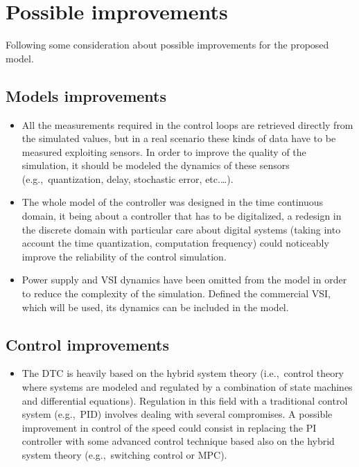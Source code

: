 \section{Possible improvements}

Following some consideration about possible improvements for the proposed model.

\subsection{Models improvements}

\begin{itemize}
	\item All the measurements required in the control loops are retrieved directly from the simulated values, but in a real scenario these kinds of data have to be measured exploiting sensors.
	In order to improve the quality of the simulation, it should be modeled the dynamics of these sensors (e.g.,\ quantization, delay, stochastic error, etc.\ldots).

	\item The whole model of the controller was designed in the time continuous domain, it being about a controller that has to be digitalized, a redesign in the discrete domain with particular care about digital systems (taking into account the time quantization, computation frequency) could noticeably improve the reliability of the control simulation.

	\item Power supply and VSI dynamics have been omitted from the model in order to reduce the complexity of the simulation.
	Defined the commercial VSI, which will be used, its dynamics can be included in the model.
\end{itemize}

\subsection{Control improvements}

\begin{itemize}
	\item The DTC is heavily based on the hybrid system theory (i.e.,\ control theory where systems are modeled and regulated by a combination of state machines and differential equations).
	Regulation in this field with a traditional control system (e.g.,\ PID) involves dealing with several compromises.
	A possible improvement in control of the speed could consist in replacing the PI controller with some advanced control technique based also on the hybrid system theory (e.g.,\ switching control or MPC).
\end{itemize}

